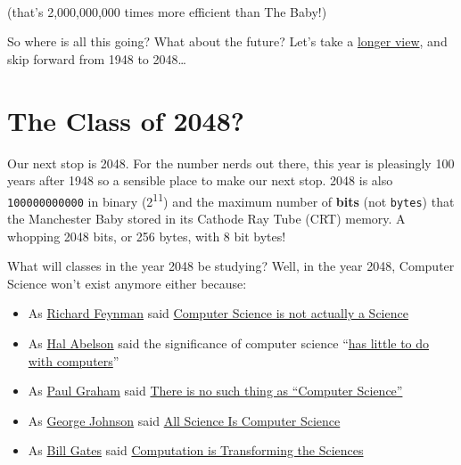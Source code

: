 \documentclass[
  12pt,
]{book}
\providecommand{\tightlist}{%
  \setlength{\itemsep}{0pt}\setlength{\parskip}{0pt}}
\begin{document}
\begin{longtable}[]
\\
\end{longtable} (that's 2,000,000,000 times more efficient than The Baby!)

So where is all this going? What about the future? Let's take a \href{https://en.wikipedia.org/wiki/Long_Now_Foundation}{longer view}, and skip forward from 1948 to 2048\ldots{}

\section{The Class of 2048?}\label{y2048}

Our next stop is 2048. For the number nerds out there, this year is pleasingly 100 years after 1948 so a sensible place to make our next stop. 2048 is also \texttt{100000000000} in binary (2\textsuperscript{11}) and the maximum number of \textbf{bits} (not \texttt{bytes}) that the Manchester Baby stored in its Cathode Ray Tube (CRT) memory. A whopping 2048 bits, or 256 bytes, with 8 bit bytes! \citep{kilburnphd}

What will classes in the year 2048 be studying? Well, in the year 2048, Computer Science won't exist anymore either because:

\begin{itemize}
\tightlist
\item
  As \href{https://en.wikipedia.org/wiki/Richard_Feynman}{Richard Feynman} said \href{https://www.flickr.com/photos/dullhunk/51956613478/}{Computer Science is not actually a Science} \citep{feynmanfysics}
\item
  As \href{https://en.wikipedia.org/wiki/Hal_Abelson}{Hal Abelson} said the significance of computer science ``\href{https://mitpress.mit.edu/sites/default/files/sicp/full-text/book/book-Z-H-7.html}{has little to do with computers}'' \citep{abelson}
\item
  As \href{https://en.wikipedia.org/wiki/Paul_Graham_(programmer)}{Paul Graham} said \href{http://www.paulgraham.com/hp.html}{There is no such thing as ``Computer Science''} \citep{bloggersandpainters, hackersandpainters}
\item
  As \href{https://en.wikipedia.org/wiki/George_Johnson_\%28writer\%29}{George Johnson} said \href{https://www.nytimes.com/2001/03/25/weekinreview/the-world-in-silica-fertilization-all-science-is-computer-science.html}{All Science Is Computer Science} \citep{georgejohnson}
\item
  As \href{https://en.wikipedia.org/wiki/Bill_Gates}{Bill Gates} said \href{https://web.archive.org/web/20080221053710/https://www.microsoft.com/presspass/exec/billg/speeches/2005/11-15SuperComputing05.aspx}{Computation is Transforming the Sciences} \citep{gatescompute}
\end{itemize}
\end{document}
